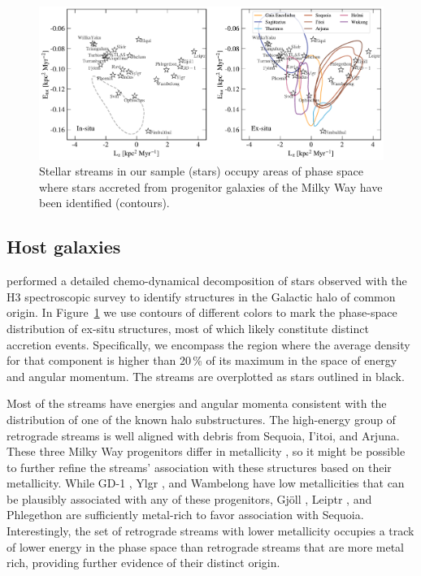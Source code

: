\documentclass[twocolumn]{aastex63}
\newcommand{\feh}{\ensuremath{\textrm{[Fe/H]}}}
\begin{document}
\begin{figure}
\begin{center}
\includegraphics[width=\textwidth]{stream_hosts.pdf}
\end{center}
\caption{
Stellar streams in our sample (stars) occupy areas of phase space where stars accreted from progenitor galaxies of the Milky Way have been identified (contours).
}
\label{fig:hosts}
\end{figure}

\subsection{Host galaxies}
\label{sec:hosts}
\citet{naidu2020} performed a detailed chemo-dynamical decomposition of stars observed with the H3 spectroscopic survey to identify structures in the Galactic halo of common origin.
In Figure~\ref{fig:hosts} we use contours of different colors to mark the phase-space distribution of ex-situ structures, most of which likely constitute distinct accretion events.
Specifically, we encompass the region where the average density for that component is higher than 20\,\% of its maximum in the space of energy and angular momentum.
The streams are overplotted as stars outlined in black.

Most of the streams have energies and angular momenta consistent with the distribution of one of the known halo substructures.
The high-energy group of retrograde streams is well aligned with debris from Sequoia, I'itoi, and Arjuna.
These three Milky Way progenitors differ in metallicity \citep{naidu2020}, so it might be possible to further refine the streams' association with these structures based on their metallicity.
While GD-1 \citep[spectroscopic $\feh=-2.3$,][]{bonaca2020b}, Ylgr \citep[spectroscopic $\feh=-1.9$,][]{ibata2019}, and  Wambelong \citep[isochrone $\feh=-2.2$,][]{shipp2018} have low metallicities that can be plausibly associated with any of these progenitors, Gj\" oll \citep[spectroscopic $\feh=-1.5$,][]{hansen2020}, Leiptr \citep[isochrone $\feh=-1.6$,][]{ibata2019}, and Phlegethon \citep[spectroscopic $\feh=-1.6$,][]{ibata2018} are sufficiently metal-rich to favor association with Sequoia.
Interestingly, the set of retrograde streams with lower metallicity occupies a track of lower energy in the phase space than retrograde streams that are more metal rich, providing further evidence of their distinct origin.
\end{document}
